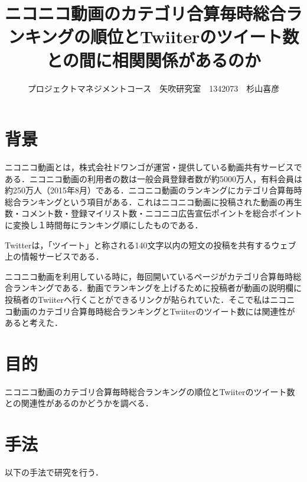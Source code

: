 \documentclass[uplatex,twocolumn,dvipdfmx]{jsarticle}
\title{\vspace{-5mm}\fontsize{14pt}{0pt}\selectfont ニコニコ動画のカテゴリ合算毎時総合ランキングの順位とTwiiterのツイート数との間に相関関係があるのか}
\author{\normalsize プロジェクトマネジメントコース　矢吹研究室　1342073　杉山喜彦}
\date{}
\begin{document}
\fontsize{10.5pt}{\baselineskip}\selectfont
\maketitle





\section{背景}


ニコニコ動画とは，株式会社ドワンゴが運営・提供している動画共有サービスである．ニコニコ動画の利用者の数は一般会員登録者数が約5000万人，有料会員は約250万人（2015年8月）である\cite{iii}．ニコニコ動画のランキングにカテゴリ合算毎時総合ランキングという項目がある．これはニコニコ動画に投稿された動画の再生数・コメント数・登録マイリスト数・ニコニコ広告宣伝ポイントを総合ポイントに変換し１時間毎にランキング順にしたものである．

Twitterは，「ツイート」と称される140文字以内の短文の投稿を共有するウェブ上の情報サービスである．

ニコニコ動画を利用している時に，毎回開いているページがカテゴリ合算毎時総合ランキングである．動画でランキングを上げるために投稿者が動画の説明欄に投稿者のTwiiterへ行くことができるリンクが貼られていた．そこで私はニコニコ動画のカテゴリ合算毎時総合ランキングとTwiiterのツイート数には関連性があると考えた．


\noindent



\section{目的}
ニコニコ動画のカテゴリ合算毎時総合ランキングの順位とTwiiterのツイート数との関連性があるのかどうかを調べる．

\section{手法}

以下の手法で研究を行う．
\end{document}
